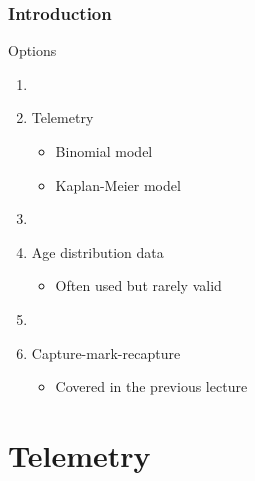 \documentclass[color=usenames,dvipsnames]{beamer}\usepackage[]{graphicx}\usepackage[]{color}
\begin{document}
\begin{frame}
  \frametitle{Introduction}
  \Large %
  {%
    Options}
  \begin{enumerate}[\bf (1)]
    \large
    \item[]
    \item Telemetry
      \begin{itemize}
        \large
        \item Binomial model
        \item Kaplan-Meier model
      \end{itemize}
    \item[]
    \item<2-> Age distribution data
      \begin{itemize}
        \item Often used but rarely valid
      \end{itemize}
    \item[]
    \item<3-> Capture-mark-recapture
      \begin{itemize}
        \item Covered in the previous lecture
      \end{itemize}
  \end{enumerate}
\end{frame}




\section{Telemetry}



\end{document}
